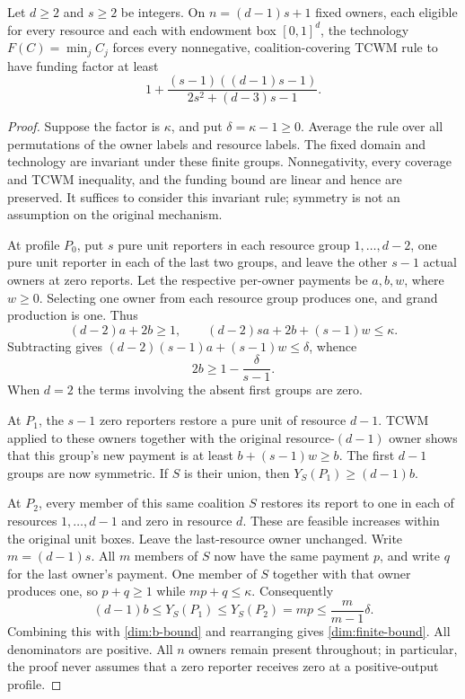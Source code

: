 \begin{proposition}\label{dim:finite-lower}
Let $d\ge2$ and $s\ge2$ be integers. On $n=(d-1)s+1$ fixed owners,
each eligible for every resource and each with endowment box $[0,1]^d$,
the technology $F(C)=\min_jC_j$ forces every nonnegative,
coalition-covering TCWM rule to have funding factor at least
\begin{equation}\label{dim:finite-bound}
 1+\frac{(s-1)((d-1)s-1)}{2s^2+(d-3)s-1}.
\end{equation}
\end{proposition}

\begin{proof}
Suppose the factor is $\kappa$, and put $\delta=\kappa-1\ge0$.
Average the rule over all permutations of the owner labels and resource
labels. The fixed domain and technology are invariant under these finite
groups. Nonnegativity, every coverage and TCWM inequality, and the funding
bound are linear and hence are preserved. It suffices to consider this
invariant rule; symmetry is not an assumption on the original mechanism.

At profile $P_0$, put $s$ pure unit reporters in each resource group
$1,\ldots,d-2$, one pure unit reporter in each of the last two groups,
and leave the other $s-1$ actual owners at zero reports. Let the respective
per-owner payments be $a,b,w$, where $w\ge0$. Selecting one owner from
each resource group produces one, and grand production is one. Thus
\[
 (d-2)a+2b\ge1,\qquad
 (d-2)sa+2b+(s-1)w\le\kappa.
\]
Subtracting gives $(d-2)(s-1)a+(s-1)w\le\delta$, whence
\begin{equation}\label{dim:b-bound}
 2b\ge1-\frac{\delta}{s-1}.
\end{equation}
When $d=2$ the terms involving the absent first groups are zero.

At $P_1$, the $s-1$ zero reporters restore a pure unit of resource $d-1$.
TCWM applied to these owners together with the original resource-$(d-1)$
owner shows that this group's new payment is at least $b+(s-1)w\ge b$.
The first $d-1$ groups are now symmetric. If $S$ is their union, then
$Y_S(P_1)\ge(d-1)b$.

At $P_2$, every member of this same coalition $S$ restores its report to
one in each of resources $1,\ldots,d-1$ and zero in resource $d$.
These are feasible increases within the original unit boxes. Leave the
last-resource owner unchanged. Write $m=(d-1)s$. All $m$ members of $S$
now have the same payment $p$, and write $q$ for the last owner's payment.
One member of $S$ together with that owner produces one, so
$p+q\ge1$ while $mp+q\le\kappa$. Consequently
\[
 (d-1)b\le Y_S(P_1)\le Y_S(P_2)=mp
 \le\frac{m}{m-1}\delta.
\]
Combining this with \eqref{dim:b-bound} and rearranging gives
\eqref{dim:finite-bound}. All denominators are positive. All $n$ owners
remain present throughout; in particular, the proof never assumes that a
zero reporter receives zero at a positive-output profile.
\end{proof}

